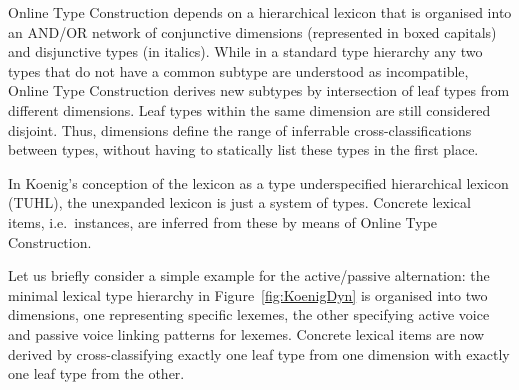 \documentclass[output=paper
 	        ,biblatex
                ,babelshorthands
                ,newtxmath
                ,draftmode
                ,colorlinks, citecolor=brown
]{langscibook}
\begin{document}
Online Type Construction depends on a hierarchical lexicon that is
organised into an AND/OR network of conjunctive dimensions
(represented in boxed capitals) and disjunctive types (in
italics). While in a standard type hierarchy any two types that do not
have a common subtype are understood as incompatible, Online Type
Construction derives new subtypes by intersection of leaf types from
different dimensions. Leaf types within the same dimension are still
considered disjoint. Thus, dimensions define the range of inferrable
cross-classifications between types, without having to statically list
these types in the first place.

In Koenig's conception of the lexicon as a type underspecified
hierarchical lexicon (TUHL), the unexpanded lexicon is just a system of
types. Concrete lexical items, i.e.\ instances, are inferred from these
by means of Online Type Construction. 

Let us briefly consider a simple example for the active/passive
alternation: the minimal lexical type hierarchy in
Figure~\ref{fig:KoenigDyn} is organised into two
dimensions, one representing specific lexemes, the other specifying
active voice and passive voice linking patterns for lexemes. Concrete
lexical items are now derived by cross-classifying exactly one leaf
type from one dimension with exactly one leaf type from the other.
\end{document}
